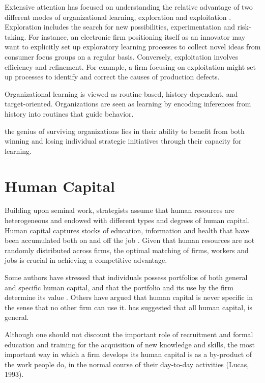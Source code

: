 \documentclass[12pt,letterpaper]{article}
\begin{document}
Extensive attention has focused on understanding the relative advantage of two different modes of organizational learning, exploration and exploitation \cite{March1991a}. Exploration includes the search for new possibilities, experimentation and risk-taking. For instance, an electronic firm positioning itself as an innovator may want to explicitly set up exploratory learning processes to collect novel ideas from consumer focus groups on a regular basis. Conversely, exploitation involves efficiency and refinement. For example, a firm focusing on exploitation might set up processes to identify and correct the causes of production defects.

Organizational learning is viewed as routine-based, history-dependent, and target-oriented. Organizations are seen as learning by encoding inferences from history into routines that guide behavior.

\cite{Burgelman1991} the genius of surviving organizations lies in their ability to benefit from both winning and losing individual strategic initiatives through their capacity for learning.
\section{Human Capital}
Building upon \cite{Becker1962} seminal work, strategists assume that human resources are heterogeneous and endowed with different types and degrees of human capital. Human capital captures stocks of education, information and health that have been accumulated both on and off the job \citep{Becker1962}. Given that human resources are not randomly distributed across firms, the optimal
matching of firms, workers and jobs is crucial in achieving a competitive advantage.

Some authors have stressed that individuals possess portfolios of both general and specific human capital, and that the portfolio and its use by the firm determine its value \citep{Campbell2012}. Others have argued that human capital is never specific in the sense that no other firm can use it. \cite{Lazear2009} has suggested that all human capital, is general.

Although one should not discount the important role of recruitment and formal education and training for the acquisition of new knowledge and skills, the most
important way in which a firm develops its human capital is as a by-product of the work people do, in the normal course of their day-to-day activities (Lucas, 1993).
\end{document}
